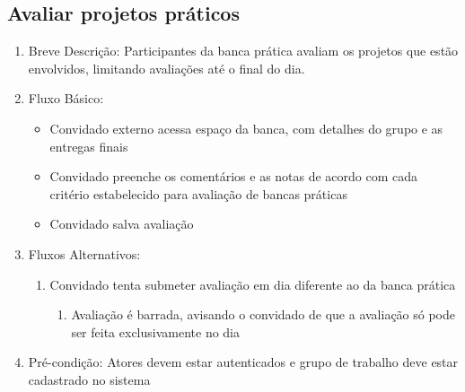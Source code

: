 \subsection{Avaliar projetos práticos}
\begin{enumerate}
    \item Breve Descrição: Participantes da banca prática avaliam os projetos que estão envolvidos, limitando avaliações até o final do dia.
    \item Fluxo Básico:
    \begin{itemize}
        \item Convidado externo acessa espaço da banca, com detalhes do grupo e as entregas finais
        \item Convidado preenche os comentários e as notas de acordo com cada critério estabelecido para avaliação de bancas práticas
        \item Convidado salva avaliação
    \end{itemize}
    \item Fluxos Alternativos:
    \begin{enumerate}
        \item Convidado tenta submeter avaliação em dia diferente ao da banca prática
        \begin{enumerate}
            \item Avaliação é barrada, avisando o convidado de que a avaliação só pode ser feita exclusivamente no dia
        \end{enumerate}
    \end{enumerate}
    \item Pré-condição: Atores devem estar autenticados e grupo de trabalho deve estar cadastrado no sistema
\end{enumerate}


